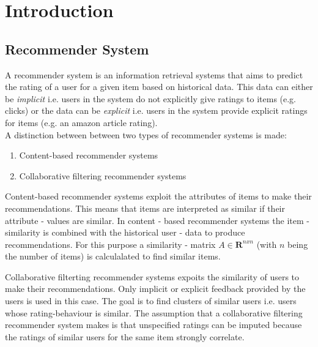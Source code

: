 


\section{Introduction}\raggedbottom

\subsection{Recommender System}
A recommender system is an information retrieval systems that aims to predict the rating of a user for a given item based on 
historical data.
This data can either be \textit{implicit} i.e. users in the system do not explicitly give ratings to items (e.g. clicks) or the data
can be \textit{explicit} i.e. users in the system provide explicit ratings for items (e.g. an amazon article rating).
\\
A distinction between between two types of recommender systems is made:
\begin{enumerate}
    \item Content-based recommender systems 
    \item Collaborative filtering recommender systems
\end{enumerate}

Content-based recommender systems exploit the attributes of items to make their recommendations.
This means that items are interpreted as similar if their attribute - values are similar. 
In content - based recommender systems the item - similarity is combined with the historical user - data to produce recommendations.
For this purpose a similarity - matrix \boldmath${A} \in \mathbf{R}^{nxn}$ (with $n$ being the number of items) is calculalated to find
similar items. 

Collaborative filterting recommender systems expoits the similarity of users to make their recommendations. Only
implicit or explicit feedback provided by the users is used in this case. The goal is to find clusters of similar users i.e.
users whose rating-behaviour is similar. The assumption that a collaborative filtering recommender system makes is that
unspecified ratings can be imputed because the ratings of similar users for the same item strongly correlate.

